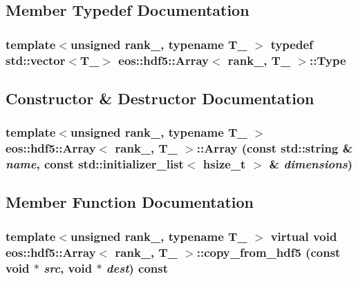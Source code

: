 \subsection{Member Typedef Documentation}
\hypertarget{classeos_1_1hdf5_1_1Array_a11f93349d9391d143099a25c59827610}{
\subsubsection[{Type}]{\setlength{\rightskip}{0pt plus 5cm}template$<$unsigned rank\_\-, typename T\_\- $>$ typedef std::vector$<$T\_\-$>$ {\bf eos::hdf5::Array}$<$ rank\_\-, T\_\- $>$::{\bf Type}}}
\label{classeos_1_1hdf5_1_1Array_a11f93349d9391d143099a25c59827610}


\subsection{Constructor \& Destructor Documentation}
\hypertarget{classeos_1_1hdf5_1_1Array_a7b2da023a1a1b9f289cbc6484e8aad2c}{
\subsubsection[{Array}]{\setlength{\rightskip}{0pt plus 5cm}template$<$unsigned rank\_\-, typename T\_\- $>$ {\bf eos::hdf5::Array}$<$ rank\_\-, T\_\- $>$::{\bf Array} (const std::string \& {\em name}, \/  const std::initializer\_\-list$<$ hsize\_\-t $>$ \& {\em dimensions})}}
\label{classeos_1_1hdf5_1_1Array_a7b2da023a1a1b9f289cbc6484e8aad2c}


\subsection{Member Function Documentation}
\hypertarget{classeos_1_1hdf5_1_1Array_aedd48f5a8020d66426bd0adfc74fa6a9}{
\subsubsection[{copy\_\-from\_\-hdf5}]{\setlength{\rightskip}{0pt plus 5cm}template$<$unsigned rank\_\-, typename T\_\- $>$ virtual void {\bf eos::hdf5::Array}$<$ rank\_\-, T\_\- $>$::copy\_\-from\_\-hdf5 (const void $\ast$ {\em src}, \/  void $\ast$ {\em dest}) const}}
\label{classeos_1_1hdf5_1_1Array_aedd48f5a8020d66426bd0adfc74fa6a9}


